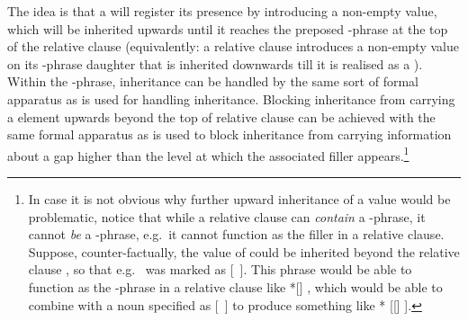 \documentclass[output=paper,nonflat,draftmode]{./langsci/langscibook}
\begin{document}
The idea is that a  will register its presence by introducing a non-empty
 value, which will be inherited upwards until it reaches the preposed
-phrase at the top of the relative clause (equivalently: a relative clause
introduces a non-empty  value on its -phrase daughter that is inherited downwards till it is
realised as a ). Within the -phrase,  inheritance can
be handled by the same sort of formal apparatus as is used for handling 
inheritance. Blocking  inheritance from carrying a  element
upwards beyond the top of relative clause can be achieved with the same formal apparatus
as is used to block  inheritance from carrying information about a gap
higher than the level at which the associated filler appears.\footnote{In case it is not
  obvious why further upward inheritance of a  value would be problematic,
  notice that while a relative clause can \emph{contain} a -phrase, it cannot
  \emph{be} a -phrase, e.g.\ it cannot function as the filler in a relative
  clause. Suppose, counter-factually, the  value of  could be inherited
  beyond the relative clause , so that e.g.\  was marked as [~]. This phrase would be able to
  function as the -phrase in a relative clause like *[] , which would be able to combine with a noun specified as
  [~] to produce something like * [[] ].}
\end{document}
